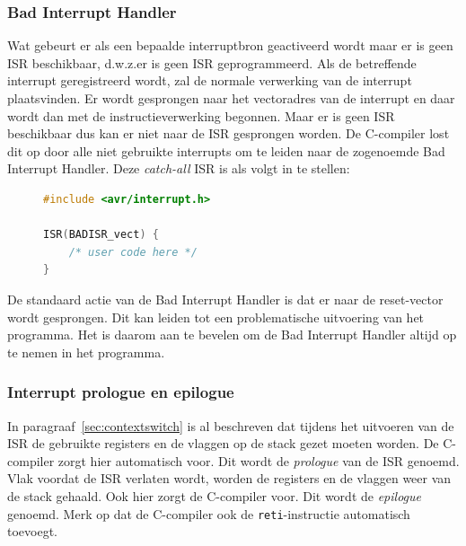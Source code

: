 \subsubsection*{Bad Interrupt Handler}
Wat gebeurt er als een bepaalde interruptbron geactiveerd wordt maar er
is geen ISR beschikbaar, d.w.z.\@ er is geen ISR geprogrammeerd. Als
de betreffende interrupt geregistreerd wordt, zal de normale verwerking
van de interrupt plaatsvinden. Er wordt gesprongen naar het vectoradres
van de interrupt en daar wordt dan met de instructieverwerking begonnen.
Maar er is geen ISR beschikbaar dus kan er niet naar de ISR gesprongen
worden. De C-compiler lost dit op door alle niet gebruikte interrupts
om te leiden naar de zogenoemde Bad Interrupt Handler. Deze
\textsl{catch-all} ISR is als volgt in te stellen:

\begin{figure}[!ht]
\begin{lstlisting}[language=C,caption=De Bad Interrupt Handler.,label=cod:intbadisr]
#include <avr/interrupt.h>

ISR(BADISR_vect) {
	/* user code here */
}
\end{lstlisting}
\end{figure}

De standaard actie van de Bad Interrupt Handler is dat er naar de reset-vector
wordt gesprongen. Dit kan leiden tot een problematische uitvoering van het
programma. Het is daarom aan te bevelen om de Bad Interrupt Handler altijd
op te nemen in het programma.

\subsubsection*{Interrupt prologue en epilogue}
In paragraaf~\ref{sec:contextswitch} is al beschreven dat tijdens het
uitvoeren van de ISR de gebruikte registers en de vlaggen op de stack
gezet moeten worden. De C-compiler zorgt hier automatisch voor. Dit wordt
de \textsl{prologue} van de ISR genoemd. Vlak voordat de ISR verlaten
wordt, worden de registers en de vlaggen weer van de stack gehaald.
Ook hier zorgt de C-compiler voor. Dit wordt de \textsl{epilogue}
genoemd. Merk op dat de C-compiler ook de \lstinline|reti|-instructie
automatisch toevoegt. 